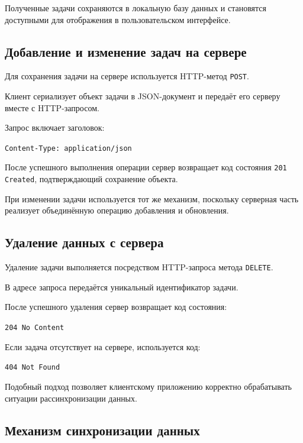 \documentclass[14pt,a4paper]{extarticle}
\begin{document}
Полученные задачи сохраняются в локальную базу данных и становятся доступными для отображения в пользовательском интерфейсе.

\subsection{Добавление и изменение задач на сервере}

Для сохранения задачи на сервере используется HTTP-метод \texttt{POST}.

Клиент сериализует объект задачи в JSON-документ и передаёт его серверу вместе с HTTP-запросом.

Запрос включает заголовок:

\begin{center}
\texttt{Content-Type: application/json}
\end{center}

После успешного выполнения операции сервер возвращает код состояния \texttt{201 Created}, подтверждающий сохранение объекта.

При изменении задачи используется тот же механизм, поскольку серверная часть реализует объединённую операцию добавления и обновления.

\subsection{Удаление данных с сервера}

Удаление задачи выполняется посредством HTTP-запроса метода \texttt{DELETE}.

В адресе запроса передаётся уникальный идентификатор задачи.

После успешного удаления сервер возвращает код состояния:

\begin{center}
\texttt{204 No Content}
\end{center}

Если задача отсутствует на сервере, используется код:

\begin{center}
\texttt{404 Not Found}
\end{center}

Подобный подход позволяет клиентскому приложению корректно обрабатывать ситуации рассинхронизации данных.

\subsection{Механизм синхронизации данных}
\end{document}
